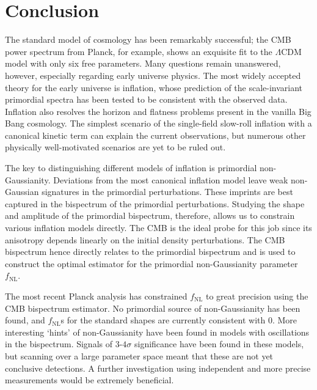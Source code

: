\chapter{Conclusion}

The standard model of cosmology has been remarkably successful; the CMB power spectrum from Planck, for example, shows an exquisite fit to the $\Lambda$CDM model with only six free parameters. Many questions remain unanswered, however, especially regarding early universe physics. The most widely accepted theory for the early universe is inflation, whose prediction of the scale-invariant primordial spectra has been tested to be consistent with the observed data. Inflation also resolves the horizon and flatness problems present in the vanilla Big Bang cosmology. The simplest scenario of the single-field slow-roll inflation with a canonical kinetic term can explain the current observations, but numerous other physically well-motivated scenarios are yet to be ruled out.

The key to distinguishing different models of inflation is primordial non-Gaussianity. Deviations from the most canonical inflation model leave weak non-Gaussian signatures in the primordial perturbations. These imprints are best captured in the bispectrum of the primordial perturbations. Studying the shape and amplitude of the primordial bispectrum, therefore, allows us to constrain various inflation models directly. The CMB is the ideal probe for this job since its anisotropy depends linearly on the initial density perturbations. The CMB bispectrum hence directly relates to the primordial bispectrum and is used to construct the optimal estimator for the primordial non-Gaussianity parameter $f_\text{NL}$. 

The most recent Planck analysis has constrained $f_\text{NL}$ to great precision using the CMB bispectrum estimator. No primordial source of non-Gaussianity has been found, and $f_\text{NL}$s for the standard shapes are currently consistent with $0$. More interesting `hints' of non-Gaussianity have been found in models with oscillations in the bispectrum. Signals of $3$-$4\sigma$ significance have been found in these models, but scanning over a large parameter space meant that these are not yet conclusive detections. A further investigation using independent and more precise measurements would be extremely beneficial.

